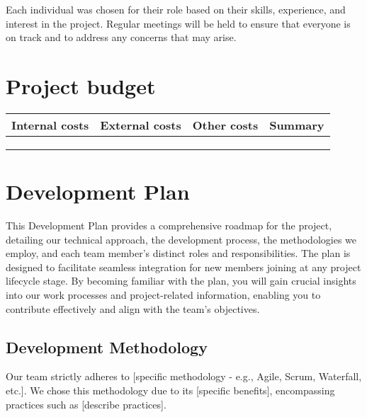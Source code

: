 \documentclass[10pt]{projectdoc}
\begin{document}
Each individual was chosen for their role based on their skills, experience, and interest in the project. Regular meetings will be held to ensure that everyone is on track and to address any concerns that may arise.


\section{Project budget}

\begin{table}[H]
    \begin{tabularx}{\columnwidth}{|X|X|X|X|}
        \hline
        Internal costs & External costs & Other costs & Summary \\ \hline
                       &                &             &         \\ \hline
                       &                &             &         \\ \hline
                       &                &             &         \\ \hline
\end{tabularx}
\end{table}

\newpage
\section{Development Plan}

This Development Plan provides a comprehensive roadmap for the project, detailing our technical approach, the development process, the methodologies we employ, and each team member's distinct roles and responsibilities. The plan is designed to facilitate seamless integration for new members joining at any project lifecycle stage. By becoming familiar with the plan, you will gain crucial insights into our work processes and project-related information, enabling you to contribute effectively and align with the team's objectives.

\subsection{Development Methodology}

Our team strictly adheres to [specific methodology - e.g., Agile, Scrum, Waterfall, etc.]. We chose this methodology due to its [specific benefits], encompassing practices such as [describe practices].
\end{document}
